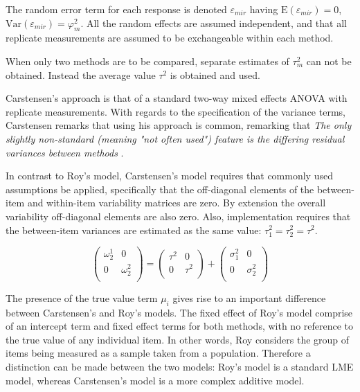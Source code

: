 \documentclass{report}
\begin{document}

The random error term for each response is denoted $\varepsilon_{mir}$ having $\mathrm{E}(\varepsilon_{mir})=0$, $\mathrm{Var}(\varepsilon_{mir})=\varphi^2_m$. All the random effects are assumed independent, and that all replicate measurements are assumed to be exchangeable within each method.


When only two methods are to be compared, separate estimates of $\tau^2_m$ can not be obtained. Instead the average value $\tau^2$ is obtained and used.


Carstensen's approach is that of a standard two-way mixed effects ANOVA with replicate measurements. With regards to the specification of the variance terms, Carstensen remarks that using his approach is common, remarking that \emph{
	The only slightly non-standard (meaning "not often used") feature is the differing residual variances between methods }\citep{bxc2010}.

In contrast to Roy's model, Carstensen's model requires that commonly used assumptions be applied, specifically that the off-diagonal elements of the between-item and within-item variability matrices are zero. By
extension the overall variability off-diagonal elements are also zero. Also, implementation requires that the between-item variances are estimated as the same value: $\tau^2_1 = \tau^2_2 = \tau^2$.


\[\left(\begin{array}{cc}
\omega^1_2  & 0 \\
0 & \omega^2_2 \\
\end{array}  \right)
=  \left(
\begin{array}{cc}
\tau^2  & 0 \\
0 & \tau^2 \\
\end{array} \right)+
\left(
\begin{array}{cc}
\sigma^2_1  & 0 \\
0 & \sigma^2_2 \\
\end{array}\right)
\]


The presence of the true value term $\mu_i$ gives rise to an important difference between Carstensen's and Roy's models. The fixed effect of Roy's model comprise of an intercept term and fixed effect terms for both methods, with no reference to the true value of any individual item. In other words, Roy considers the group of items being measured as a sample taken from a population. Therefore a distinction can be made between the two models: Roy's model is a standard LME model, whereas Carstensen's model is a more complex additive model.
\end{document}
